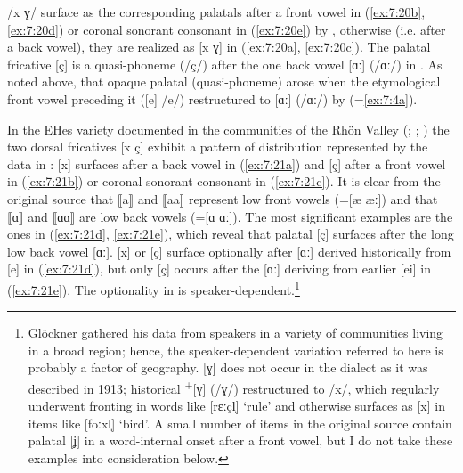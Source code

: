 /x ɣ/ surface as the corresponding palatals after a front vowel in (\ref{ex:7:20b}, \ref{ex:7:20d}) or coronal sonorant consonant in (\ref{ex:7:20e}) by , otherwise (i.e. after a back vowel), they are realized as [x ɣ] in (\ref{ex:7:20a}, \ref{ex:7:20c}). The palatal fricative [ç] is a quasi-phoneme (/ç/) after the one back vowel [ɑː] (/ɑː/) in . As noted above, that opaque palatal (quasi-phoneme) arose when the etymological front vowel preceding it ([e] /e/) restructured to [ɑː] (/ɑː/) by  (=\ref{ex:7:4a}).

In the EHes variety documented in the communities of the Rhön Valley (; \citealt{Glöckner1913}; ) the two dorsal fricatives [x ç] exhibit a pattern of distribution represented by the data in :  [x] surfaces after a back vowel in (\ref{ex:7:21a}) and [ç] after a front vowel in (\ref{ex:7:21b}) or coronal sonorant consonant in (\ref{ex:7:21c}). It is clear from the original source that ⟦a⟧ and ⟦aa⟧ represent low front vowels (=[æ æː]) and that ⟦ɑ⟧ and ⟦ɑɑ⟧ are low back vowels (=[ɑ ɑː]). The most significant examples are the ones in (\ref{ex:7:21d}, \ref{ex:7:21e}), which reveal that palatal [ç] surfaces after the long low back vowel [ɑː]. [x] or [ç] surface optionally after [ɑː] derived historically from [e] in (\ref{ex:7:21d}), but only [ç] occurs after the [ɑː] deriving from earlier [ei] in (\ref{ex:7:21e}). The optionality in  is speaker-dependent.\footnote{{Glöckner gathered his data from speakers in a variety of communities living in a broad region; hence, the speaker-dependent variation referred to here is probably a factor of geography. [ɣ] does not occur in the dialect as it was described in 1913; historical} \textrm{\textsuperscript{+}}\textrm{[ɣ] (/ɣ/) restructured to /x/, which regularly underwent fronting in words like [rɛːçl̩] ‘rule’ and otherwise surfaces as [x] in items like [foːxl̩] ‘bird’. A small number of items in the original source contain palatal [ʝ] in a word-internal onset after a front vowel, but I do not take these examples into consideration below.} }


